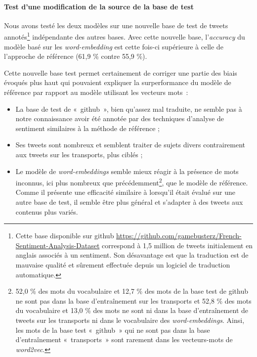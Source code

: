 \documentclass[11pt,french,french]{article}
\let\rmarkdownfootnote\footnote%
\def\footnote{\protect\rmarkdownfootnote}
\begin{document}
\hypertarget{test-dune-modification-de-la-source-de-la-base-de-test}{%
\paragraph{Test d'une modification de la source de la base de test}\label{test-dune-modification-de-la-source-de-la-base-de-test}}

Nous avons testé les deux modèles sur une nouvelle base de test de tweets annotés\footnote{Cette base disponible sur github \url{https://github.com/gamebusterz/French-Sentiment-Analysis-Dataset} correspond à 1,5 million de tweets initialement en anglais associés à un sentiment.
  Son désavantage est que la traduction est de mauvaise qualité et sûrement effectuée depuis un logiciel de traduction automatique.} indépendante des autres bases.
Avec cette nouvelle base, l'\emph{accuracy} du modèle basé sur les \emph{word-embedding} est cette fois-ci supérieure à celle de l'approche de référence (61,9 \% contre 55,9 \%).

Cette nouvelle base test permet certainement de corriger une partie des biais évoqués plus haut qui pouvaient expliquer la surperformance du modèle de référence par rapport au modèle utilisant les vecteurs mots~:

\begin{itemize}
\item
  La base de test de «~github~», bien qu'assez mal traduite, ne semble pas à notre connaissance avoir été annotée par des techniques d'analyse de sentiment similaires à la méthode de référence ;
\item
  Ses tweets sont nombreux et semblent traiter de sujets divers contrairement aux tweets sur les transports, plus ciblés ;
\item
  Le modèle de \emph{word-embeddings} semble mieux réagir à la présence de mots inconnus, ici plus nombreux que précédemment\footnote{52,0 \% des mots du vocabulaire et 12,7 \% des mots de la base test de github ne sont pas dans la base d'entraînement sur les transports et 52,8 \% des mots du vocabulaire et 13,0 \% des mots ne sont ni dans la base d'entraînement de tweets sur les transports ni dans le vocabulaire des \emph{word-embeddings}.
    Ainsi, les mots de la base test «~github~» qui ne sont pas dans la base d'entraînement «~transports~» sont rarement dans les vecteurs-mots de \emph{word2vec}.}, que le modèle de référence.
  Comme il présente une efficacité similaire à lorsqu'il était évalué sur une autre base de test, il semble être plus général et s'adapter à des tweets aux contenus plus variés.
\end{itemize}
\end{document}
